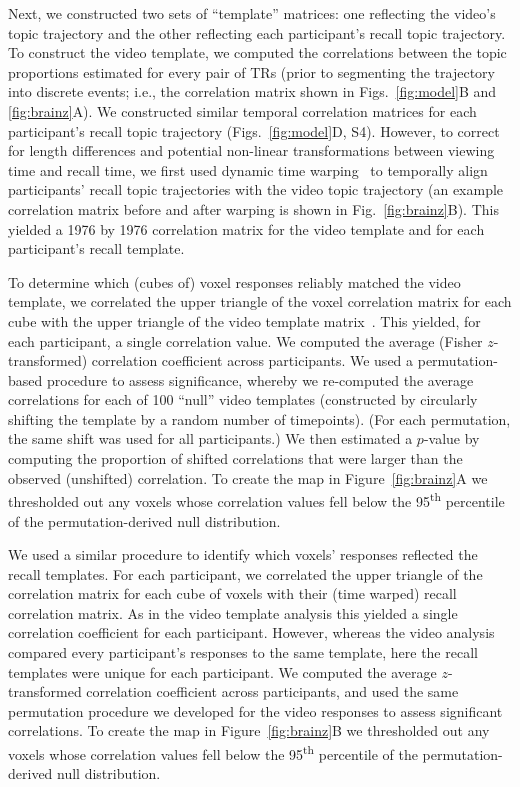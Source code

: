 \documentclass{article}
\newcommand{\corrmats}{S4}
\begin{document}
Next, we constructed two sets of ``template'' matrices: one reflecting the video's topic trajectory and the other reflecting each participant's recall topic trajectory.  To construct the video template, we computed the correlations between the topic proportions estimated for every pair of TRs (prior to segmenting the trajectory into discrete events; i.e., the correlation matrix shown in Figs.~\ref{fig:model}B and \ref{fig:brainz}A).  We constructed similar temporal correlation matrices for each participant's recall topic trajectory (Figs.~\ref{fig:model}D, \corrmats).  However, to correct for length differences and potential non-linear transformations between viewing time and recall time, we first used dynamic time warping~\citep{BernClif94} to temporally align participants' recall topic trajectories with the video topic trajectory (an example correlation matrix before and after warping is shown in Fig.~\ref{fig:brainz}B).  This yielded a 1976 by 1976 correlation matrix for the video template and for each participant's recall template.

To determine which (cubes of) voxel responses reliably matched the video template, we correlated the upper triangle of the voxel correlation matrix for each cube with the upper triangle of the video template matrix~\citep{KrieEtal08b}.  This yielded, for each participant, a single correlation value.  We computed the average (Fisher $z$-transformed) correlation coefficient across participants.  We used a permutation-based procedure to assess significance, whereby we re-computed the average correlations for each of 100 ``null'' video templates (constructed by circularly shifting the template by a random number of timepoints).  (For each permutation, the same shift was used for all participants.)  We then estimated a $p$-value by computing the proportion of shifted correlations that were larger than the observed (unshifted) correlation.  To create the map in Figure~\ref{fig:brainz}A we thresholded out any voxels whose correlation values fell below the 95\textsuperscript{th} percentile of the permutation-derived null distribution.

We used a similar procedure to identify which voxels' responses reflected the recall templates.  For each participant, we correlated the upper triangle of the correlation matrix for each cube of voxels with their (time warped) recall correlation matrix.  As in the video template analysis this yielded a single correlation coefficient for each participant.  However, whereas the video analysis compared every participant's responses to the same template, here the recall templates were unique for each participant.  We computed the average $z$-transformed correlation coefficient across participants, and used the same permutation procedure we developed for the video responses to assess significant correlations.  To create the map in Figure~\ref{fig:brainz}B we thresholded out any voxels whose correlation values fell below the 95\textsuperscript{th} percentile of the permutation-derived null distribution.
\end{document}
